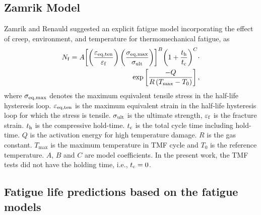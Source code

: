 \documentclass[preprint,5p,twocolumn,11pt,sort&compress]{elsarticle}
\begin{document}
\subsection{Zamrik Model}

Zamrik and Renauld \cite{Zamrik2000} suggested an explicit fatigue model incorporating the effect of creep, environment, and temperature for thermomechanical fatigue, as
\begin{equation}
\begin{aligned}
{N_{\rm f}} = A{\left[ {\left( {\frac{{{\varepsilon _{\rm eq,ten}}}}{{{\varepsilon _{\rm f}}}}} \right)\left( {\frac{{{\sigma _{\rm eq,\max }}}}{{{\sigma _{\rm ult}}}}} \right)} \right]^B} 
{\left( {1 + \frac{{{t_{\rm h}}}}{{{t_{\rm c}}}}} \right)^C}\cdot \\
\exp \left[ {\frac{{ - Q}}{{R\left( {{T_{\max }} - {T_0}} \right)}}} \right],
\end{aligned}
\label{Equ:StudyModel}
\end{equation}
where $\sigma _{\rm eq,\max }$ denotes the maximum equivalent tensile stress in the half-life hysteresis loop. $\varepsilon _{\rm eq,ten}$ is the maximum equivalent strain in the half-life hysteresis loop for which the stress is tensile. $\sigma _{\rm ult}$ is the ultimate strength, $\varepsilon _{\rm f}$ is the fracture strain. $t_{\rm h}$ is the compressive hold-time. $t_{\rm c}$ is the total cycle time including hold-time. $Q$ is the activation energy for high temperature damage. $R$ is the gas constant. $T_{\max}$ is the maximum temperature in TMF cycle and $T_0$ is the reference temperature. $A$, $B$ and $C$ are model coefficients. In the present work, the TMF tests did not have the holding time, i.e., $t_{\rm c}=0$.

\subsection{Fatigue life predictions based on the fatigue models}
\end{document}
